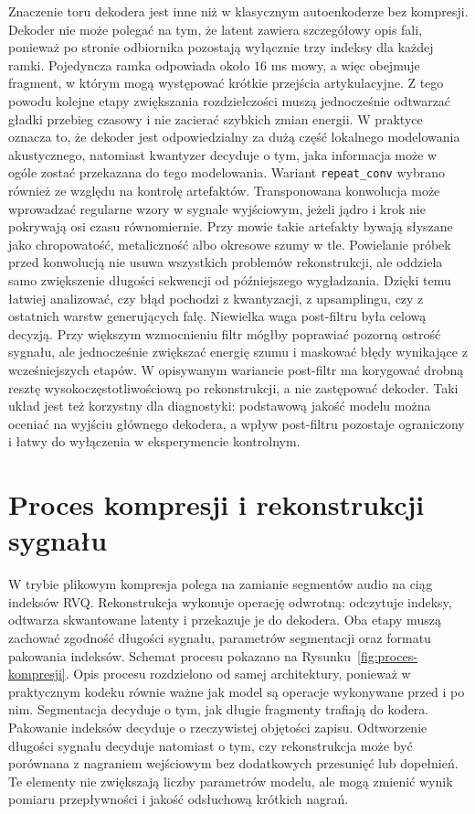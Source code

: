 Znaczenie toru dekodera jest inne niż w klasycznym autoenkoderze bez kompresji. Dekoder nie może polegać na tym, że latent zawiera szczegółowy opis fali, ponieważ po stronie odbiornika pozostają wyłącznie trzy indeksy dla każdej ramki. Pojedyncza ramka odpowiada około \(16\) ms mowy, a więc obejmuje fragment, w którym mogą występować krótkie przejścia artykulacyjne. Z tego powodu kolejne etapy zwiększania rozdzielczości muszą jednocześnie odtwarzać gładki przebieg czasowy i nie zacierać szybkich zmian energii. W praktyce oznacza to, że dekoder jest odpowiedzialny za dużą część lokalnego modelowania akustycznego, natomiast kwantyzer decyduje o tym, jaka informacja może w ogóle zostać przekazana do tego modelowania. Wariant \texttt{repeat\_conv} wybrano również ze względu na kontrolę artefaktów. Transponowana konwolucja może wprowadzać regularne wzory w sygnale wyjściowym, jeżeli jądro i krok nie pokrywają osi czasu równomiernie. Przy mowie takie artefakty bywają słyszane jako chropowatość, metaliczność albo okresowe szumy w tle. Powielanie próbek przed konwolucją nie usuwa wszystkich problemów rekonstrukcji, ale oddziela samo zwiększenie długości sekwencji od późniejszego wygładzania. Dzięki temu łatwiej analizować, czy błąd pochodzi z kwantyzacji, z upsamplingu, czy z ostatnich warstw generujących falę. Niewielka waga post-filtru była celową decyzją. Przy większym wzmocnieniu filtr mógłby poprawiać pozorną ostrość sygnału, ale jednocześnie zwiększać energię szumu i maskować błędy wynikające z wcześniejszych etapów. W opisywanym wariancie post-filtr ma korygować drobną resztę wysokoczęstotliwościową po rekonstrukcji, a nie zastępować dekoder. Taki układ jest też korzystny dla diagnostyki: podstawową jakość modelu można oceniać na wyjściu głównego dekodera, a wpływ post-filtru pozostaje ograniczony i łatwy do wyłączenia w eksperymencie kontrolnym.

\newpage

\section{Proces kompresji i rekonstrukcji sygnału}
\label{sec:kompresja-rekonstrukcja}

W trybie plikowym kompresja polega na zamianie segmentów audio na ciąg indeksów RVQ. Rekonstrukcja wykonuje operację odwrotną: odczytuje indeksy, odtwarza skwantowane latenty i przekazuje je do dekodera. Oba etapy muszą zachować zgodność długości sygnału, parametrów segmentacji oraz formatu pakowania indeksów. Schemat procesu pokazano na Rysunku~\ref{fig:proces-kompresji}. Opis procesu rozdzielono od samej architektury, ponieważ w praktycznym kodeku równie ważne jak model są operacje wykonywane przed i po nim. Segmentacja decyduje o tym, jak długie fragmenty trafiają do kodera. Pakowanie indeksów decyduje o rzeczywistej objętości zapisu. Odtworzenie długości sygnału decyduje natomiast o tym, czy rekonstrukcja może być porównana z nagraniem wejściowym bez dodatkowych przesunięć lub dopełnień. Te elementy nie zwiększają liczby parametrów modelu, ale mogą zmienić wynik pomiaru przepływności i jakość odsłuchową krótkich nagrań.

